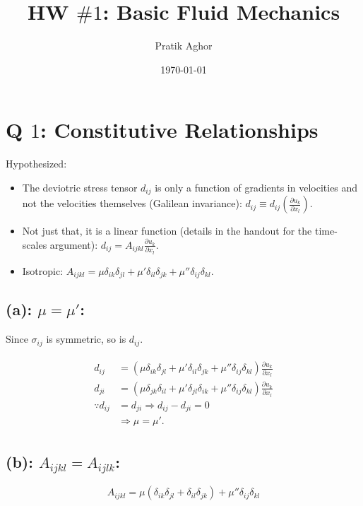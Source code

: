 \documentclass{article}
\author{Pratik Aghor}
\title{HW $\# 1$: Basic Fluid Mechanics}
\date{\today}  %
\begin{document}
\maketitle
\section{Q $1$: Constitutive Relationships}
Hypothesized:
\begin{itemize}
 \item The deviotric stress tensor $d_{ij}$ is only a function of gradients in velocities and not the velocities themselves (Galilean invariance): $d_{ij}\equiv d_{ij}(\frac{\partial u_{k}}{\partial x_{l}})$.
 \item Not just that, it is a linear function (details in the handout for the time-scales argument):
 $d_{ij} = A_{ijkl} \frac{\partial u_{k}}{\partial x_{l}}$.
 \item Isotropic: $A_{ijkl} = \mu \delta_{ik}\delta_{jl} + \mu' \delta_{il}\delta_{jk} + \mu'' \delta_{ij}\delta_{kl}$.
\end{itemize}
\subsection*{(a): $\mu = \mu'$:}
Since $\sigma_{ij}$ is symmetric, so is $d_{ij}$. 

\begin{align}\label{eq:dij_symm}
    \begin{split}
     d_{ij} &= (\mu \delta_{ik}\delta_{jl} + \mu' \delta_{il}\delta_{jk} + \mu'' \delta_{ij}\delta_{kl})\frac{\partial u_{k}}{\partial x_{l}} \\  
     d_{ji} &= (\mu \delta_{jk}\delta_{il} + \mu' \delta_{jl}\delta_{ik} + \mu'' \delta_{ij}\delta_{kl})\frac{\partial u_{k}}{\partial x_{l}} \\ 
     \because d_{ij} & = d_{ji} \Rightarrow d_{ij} - d_{ji} = 0\\
    & \Rightarrow \boxed{\mu = \mu'}.
    \end{split}
\end{align}

\subsection*{(b): $A_{ijkl} = A_{ijlk}$:}
$$A_{ijkl} = \mu (\delta_{ik}\delta_{jl} + \delta_{il}\delta_{jk}) + \mu'' \delta_{ij}\delta_{kl}$$
\end{document}
